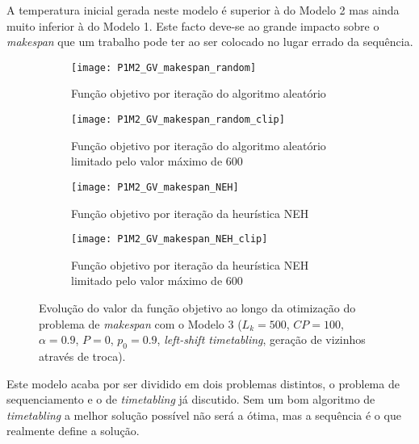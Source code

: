 A temperatura inicial gerada neste modelo é superior à do Modelo 2 mas ainda muito inferior à do Modelo 1. Este facto deve-se ao grande impacto sobre o \textit{makespan} que um trabalho pode ter ao ser colocado no lugar errado da sequência.\\
\begin{figure}[H]
    \centering    
    \begin{subfigure}{0.49\textwidth}
        \centering
        \texttt{[image: P1M2\_GV\_makespan\_random]}
        \caption{Função objetivo por iteração do algoritmo aleatório}
        \label{fig:P1M2_GV_makespan_random}
    \end{subfigure}
    \hfill
    \begin{subfigure}{0.49\textwidth}
        \centering
        \texttt{[image: P1M2\_GV\_makespan\_random\_clip]}
        \caption{Função objetivo por iteração do algoritmo aleatório limitado pelo valor máximo de 600}
        \label{fig:P1M2_GV_makespan_random_clip}
    \end{subfigure}
    
    \begin{subfigure}{0.49\textwidth}
        \centering
        \texttt{[image: P1M2\_GV\_makespan\_NEH]}
        \caption{Função objetivo por iteração da heurística NEH}
        \label{fig:P1M2_GV_makespan_NEH}
    \end{subfigure}
    \hfill
    \begin{subfigure}{0.49\textwidth}
        \centering
        \texttt{[image: P1M2\_GV\_makespan\_NEH\_clip]}
        \caption{Função objetivo por iteração da heurística NEH limitado pelo valor máximo de 600}
        \label{fig:P1M2_GV_makespan_NEH_clip}
    \end{subfigure}
    \caption{Evolução do valor da função objetivo ao longo da otimização do problema de \textit{makespan} com o Modelo 3 ($L_{k}=500$, $CP=100$, $\alpha=0.9$, $P=0$, $p_{0}=0.9$, \textit{left-shift timetabling}, geração de vizinhos através de troca).}
    \label{fig:P1M2_GV_dif_sol_ini}
\end{figure}

Este modelo acaba por ser dividido em dois problemas distintos, o problema de sequenciamento e o de \textit{timetabling} já discutido. Sem um bom algoritmo de \textit{timetabling} a melhor solução possível não será a ótima, mas a sequência é o que realmente define a solução.\\










